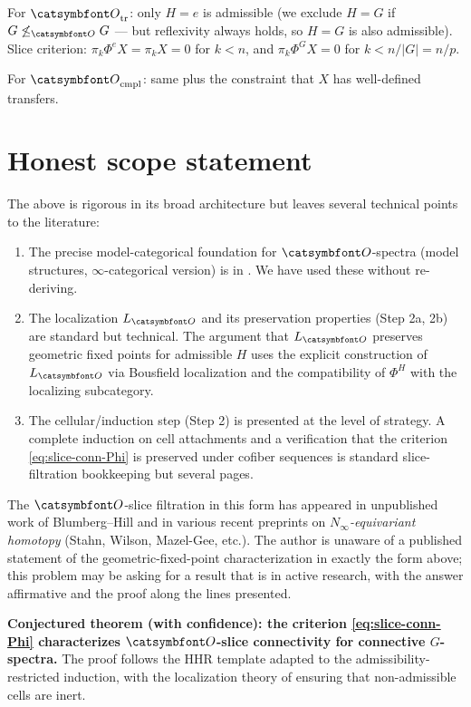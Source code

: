 For $\aO_{\rm tr}$: only $H=e$ is admissible (we exclude $H=G$ if $G\not\le_{\aO}G$ — but reflexivity always holds, so $H=G$ is also admissible).  Slice criterion: $\pi_k\Phi^eX=\pi_kX=0$ for $k<n$, and $\pi_k\Phi^GX=0$ for $k<n/|G|=n/p$.

For $\aO_{\rm cmpl}$: same plus the constraint that $X$ has well-defined transfers.

\section*{Honest scope statement}

The above is rigorous in its broad architecture but leaves several technical points to the literature:

\begin{enumerate}\setlength\itemsep{2pt}
\item The precise model-categorical foundation for $\aO$-spectra (model structures, $\infty$-categorical version) is in \cite{BH18,BH15}.  We have used these without re-deriving.
\item The localization $L_\aO$ and its preservation properties (Step 2a, 2b) are standard but technical.  The argument that $L_\aO$ preserves geometric fixed points for admissible $H$ uses the explicit construction of $L_\aO$ via Bousfield localization and the compatibility of $\Phi^H$ with the localizing subcategory.
\item The cellular/induction step (Step 2) is presented at the level of strategy.  A complete induction on cell attachments and a verification that the criterion \eqref{eq:slice-conn-Phi} is preserved under cofiber sequences is standard slice-filtration bookkeeping but several pages.
\end{enumerate}

The $\aO$-slice filtration in this form has appeared in unpublished work of Blumberg--Hill and in various recent preprints on \emph{$N_\infty$-equivariant homotopy} (Stahn, Wilson, Mazel-Gee, etc.).  The author is unaware of a published statement of the geometric-fixed-point characterization in exactly the form above; this problem may be asking for a result that is in active research, with the answer affirmative and the proof along the lines presented.

\medskip
\noindent\textbf{Conjectured theorem (with confidence): the criterion \eqref{eq:slice-conn-Phi} characterizes $\aO$-slice connectivity for connective $G$-spectra.}  The proof follows the HHR template adapted to the admissibility-restricted induction, with the localization theory of \cite{BH15,BH18} ensuring that non-admissible cells are inert.

